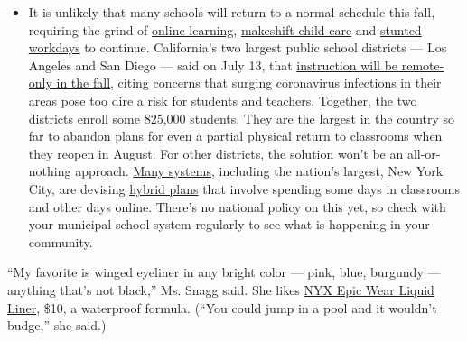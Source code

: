 \begin{itemize}
  \begin{itemize}
  \tightlist
  \item
    It is unlikely that many schools will return to a normal schedule
    this fall, requiring the grind of
    \href{https://www.nytimes3xbfgragh.onion/2020/06/05/us/coronavirus-education-lost-learning.html?action=click\&pgtype=Article\&state=default\&region=MAIN_CONTENT_3\&context=storylines_faq}{online
    learning},
    \href{https://www.nytimes3xbfgragh.onion/2020/05/29/us/coronavirus-child-care-centers.html?action=click\&pgtype=Article\&state=default\&region=MAIN_CONTENT_3\&context=storylines_faq}{makeshift
    child care} and
    \href{https://www.nytimes3xbfgragh.onion/2020/06/03/business/economy/coronavirus-working-women.html?action=click\&pgtype=Article\&state=default\&region=MAIN_CONTENT_3\&context=storylines_faq}{stunted
    workdays} to continue. California's two largest public school
    districts --- Los Angeles and San Diego --- said on July 13, that
    \href{https://www.nytimes3xbfgragh.onion/2020/07/13/us/lausd-san-diego-school-reopening.html?action=click\&pgtype=Article\&state=default\&region=MAIN_CONTENT_3\&context=storylines_faq}{instruction
    will be remote-only in the fall}, citing concerns that surging
    coronavirus infections in their areas pose too dire a risk for
    students and teachers. Together, the two districts enroll some
    825,000 students. They are the largest in the country so far to
    abandon plans for even a partial physical return to classrooms when
    they reopen in August. For other districts, the solution won't be an
    all-or-nothing approach.
    \href{https://bioethics.jhu.edu/research-and-outreach/projects/eschool-initiative/school-policy-tracker/}{Many
    systems}, including the nation's largest, New York City, are
    devising
    \href{https://www.nytimes3xbfgragh.onion/2020/06/26/us/coronavirus-schools-reopen-fall.html?action=click\&pgtype=Article\&state=default\&region=MAIN_CONTENT_3\&context=storylines_faq}{hybrid
    plans} that involve spending some days in classrooms and other days
    online. There's no national policy on this yet, so check with your
    municipal school system regularly to see what is happening in your
    community.
  \end{itemize}
\end{itemize}

``My favorite is winged eyeliner in any bright color --- pink, blue,
burgundy --- anything that's not black,'' Ms. Snagg said. She likes
\href{https://www.nyxcosmetics.com/eyes/eyeliner/epic-wear-liquid-liner/NYX_806.html}{NYX
Epic Wear Liquid Liner}, \$10, a waterproof formula. (``You could jump
in a pool and it wouldn't budge,'' she said.)

